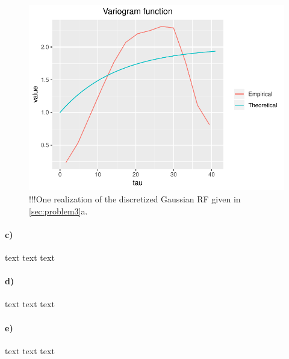 \begin{figure}
    \centering
    \includegraphics[scale=0.95]{figures/3b_variogram.pdf}
    \caption{!!!One realization of the discretized Gaussian RF given in \ref{sec:problem3}a.}
    \label{fig:3a_realization}
\end{figure}

\paragraph{c)}
text text text

\paragraph{d)}
text text text

\paragraph{e)}
text text text
